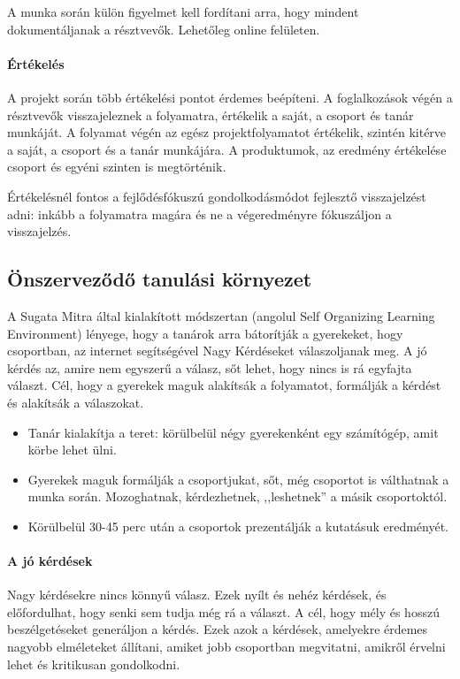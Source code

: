 A munka során külön figyelmet kell fordítani arra, hogy mindent dokumentáljanak
a résztvevők. Lehetőleg online felületen.
\paragraph{Értékelés} A projekt során több értékelési pontot érdemes beépíteni.
A foglalkozások végén a résztvevők visszajeleznek a folyamatra, értékelik a
saját, a csoport és tanár munkáját. A folyamat végén az egész projektfolyamatot
értékelik, szintén kitérve a saját, a csoport és a tanár munkájára. A
produktumok, az eredmény értékelése csoport és egyéni szinten is megtörténik.

Értékelésnél fontos a fejlődésfókuszú gondolkodásmódot fejlesztő visszajelzést
adni: inkább a folyamatra magára és ne a végeredményre fókuszáljon a
visszajelzés.

\subsection{Önszerveződő tanulási környezet}
A Sugata Mitra által kialakított módszertan (angolul Self Organizing Learning
Environment) lényege, hogy a tanárok arra
bátorítják a gyerekeket, hogy csoportban, az internet segítségével Nagy
Kérdéseket válaszoljanak meg. A jó kérdés az, amire nem egyszerű a válasz, sőt
lehet, hogy nincs is rá egyfajta választ. Cél, hogy a gyerekek maguk alakítsák
a folyamatot, formálják a kérdést és alakítsák a válaszokat.

\begin{itemize}
      \item Tanár kialakítja a teret: körülbelül négy gyerekenként egy
            számítógép,
            amit körbe lehet ülni.
      \item Gyerekek maguk formálják a csoportjukat, sőt, még csoportot is
            válthatnak a munka során. Mozoghatnak, kérdezhetnek, ,,leshetnek''
            a
            másik
            csoportoktól.
      \item Körülbelül 30-45 perc után a csoportok prezentálják a kutatásuk
            eredményét.
\end{itemize}

\paragraph{A jó kérdések}
Nagy kérdésekre nincs könnyű válasz. Ezek nyílt és nehéz kérdések, és
előfordulhat, hogy senki sem tudja még rá a választ. A cél, hogy mély és hosszú
beszélgetéseket generáljon a kérdés. Ezek azok a kérdések, amelyekre érdemes
nagyobb elméleteket állítani, amiket jobb csoportban megvitatni, amikről
érvelni lehet és kritikusan gondolkodni.


